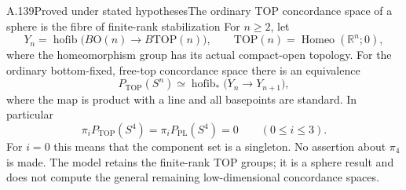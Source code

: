 \begin{saresult}{A.139}{Proved under stated hypotheses}{The ordinary TOP concordance space of a sphere is the fibre of finite-rank stabilization}
For $n\ge2$, let
\[
 Y_n=\operatorname{hofib}\bigl(B\mathrm O(n)\longrightarrow
                                     B\mathrm{TOP}(n)\bigr),
 \qquad
 \mathrm{TOP}(n)=\operatorname{Homeo}(\mathbb R^n;0),
                                                        \tag{A.139.1}
\]
where the homeomorphism group has its actual compact-open topology.
For the ordinary bottom-fixed, free-top concordance space there is
an equivalence
\[
 P_{\mathrm{TOP}}(S^n)
   \simeq\operatorname{hofib}_*\bigl(Y_n\longrightarrow Y_{n+1}\bigr),
                                                        \tag{A.139.2}
\]
where the map is product with a line and all basepoints are standard.
In particular
\[
 \pi_i P_{\mathrm{TOP}}(S^4)=
 \pi_i P_{\mathrm{PL}}(S^4)=0\qquad(0\le i\le3).          \tag{A.139.3}
\]
For $i=0$ this means that the component set is a singleton.
No assertion about $\pi_4$ is made. The model retains the
finite-rank TOP groups; it is a sphere result and does not compute
the general remaining low-dimensional concordance spaces.
\end{saresult}
